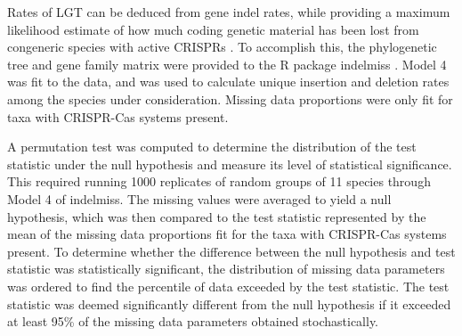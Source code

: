 \documentclass[english]{article}
\begin{document}
Rates of LGT can be deduced from gene indel rates, while providing a maximum likelihood estimate of how
much coding genetic material has been lost from congeneric
species with active CRISPRs \citep{Dang:15}. 
To accomplish this, the phylogenetic tree and gene family matrix were provided to
the R package indelmiss \citep{Dang:15}.  Model 4 was fit to the data, and was used to
calculate unique insertion and deletion rates among the species under
consideration. Missing data proportions were only fit for taxa with
CRISPR-Cas systems present.

A permutation test was computed to determine the distribution of the
test statistic under the null hypothesis and measure its level of
statistical significance. This required running 1000 replicates of
random groups of 11 species through Model 4 of indelmiss. The missing
values were averaged to yield a null hypothesis, which was then
compared to the test statistic represented by the mean of the missing
data proportions fit for the taxa with CRISPR-Cas systems present. To
determine whether the difference between the null hypothesis and test
statistic was statistically significant, the distribution of missing
data parameters was ordered to find the percentile of data exceeded by
the test statistic. The test statistic was deemed significantly
different from the null hypothesis if it exceeded at least 95\% of the
missing data parameters obtained stochastically. 
\end{document}
